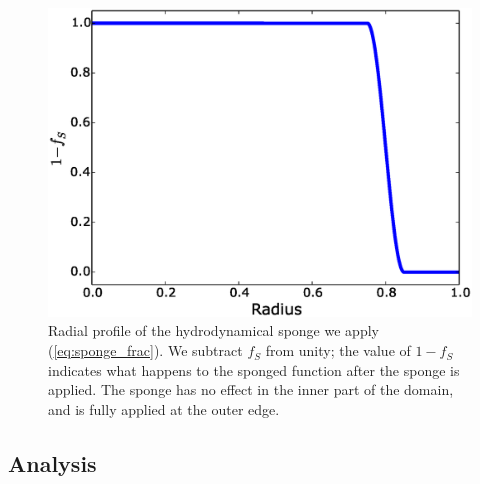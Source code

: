 \documentclass[iop]{../emulateapj}
\begin{document}
\begin{figure}
  \centering
  \includegraphics[scale=0.4]{plots/sponge}
  \caption{Radial profile of the hydrodynamical sponge we apply (\autoref{eq:sponge_frac}). 
           We subtract $f_S$ from unity; the value of $1 - f_S$ indicates what happens 
           to the sponged function after the sponge is applied. The sponge has no effect 
           in the inner part of the domain, and is fully applied at the outer edge.\label{fig:sponge}}
\end{figure}

\subsection{Analysis}
\label{sec:analysis}
\end{document}
